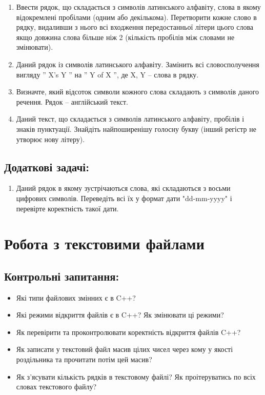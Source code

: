 \documentclass[a5paper,titlepage,openany,twoside,
]
{book_unv}%
\begin{document}
\begin{enumerate}
\item
 Ввести рядок, що складається з символів латинського алфавіту, слова в якому
  відокремлені пробілами (одним або декількома). Перетворити кожне слово в
  рядку, видаливши з нього всі входження передостанньої літери цього 
  слова якщо довжина слова більше ніж 2 (кількість пробілів між словами не змінювати).

\item
Даний рядок із символів латинського алфавіту. Замінить всі словосполучення
вигляду '' X's Y '' на '' Y of X '', де X, Y -- слова в рядку.

\item
  Визначте, який відсоток символи кожного слова складають з символів
  даного речення. Рядок -- англійський текст.
\item
  Даний текст, що складається з символів латинського алфавіту, пробілів і
  знаків пунктуації. Знайдіть найпоширенішу голосну букву 
(інший регістр не утворює нову літеру).


\end{enumerate}

\section{Додаткові задачі:}

\begin{enumerate}
\def\labelenumi{\arabic{enumi})}
\setcounter{enumi}{24}
\item
  Даний рядок в якому зустрічаються слова, які складаються з восьми
  цифрових символів. Переведіть всі їх у формат дати "dd-mm-yyyy" і
  перевірте коректність такої дати.
\end{enumerate}




\chapter{Робота з текстовими файлами}
%

\section{Контрольні запитання:}
\begin{itemize}
\item
 Які типи файлових змінних є в C++?
\item
 Які режими відкриття файлів є в C++? Як змінювати ці режими?
\item
 Як перевірити та проконтролювати коректність відкриття файлів C++?
\item
  Як записати у текстовий файл масив цілих чисел через кому у якості
  роздільника та прочитати потім цей масив?
\item
  Як з'ясувати кількість рядків в текстовому файлі? Як проітеруватись по всіх
словах текстового файлу?

\end{itemize}
\end{document}
